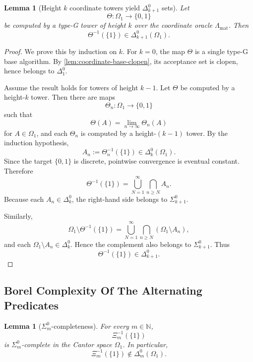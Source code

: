 \documentclass{lmcs} %
\theoremstyle{plain}
\theoremstyle{plain}
\newtheorem{lemma}[theorem]{Lemma}
\theoremstyle{definition}
\theoremstyle{remark}
\theoremstyle{definition}
\theoremstyle{remark}
\numberwithin{equation}{section}
\begin{document}
\begin{lemma}[Height \(k\) coordinate towers yield \(\Delta^0_{k+1}\) sets]\label{lem:height-k-delta}
Let
\[
\Theta:\Omega_1\to\{0,1\}
\]
be computed by a type-G tower of height \(k\) over the coordinate oracle \(\Lambda_{\mathrm{mat}}\). Then
\[
\Theta^{-1}(\{1\})\in\Delta^0_{k+1}(\Omega_1).
\]
\end{lemma}

\begin{proof}
We prove this by induction on \(k\). For \(k=0\), the map \(\Theta\) is a single type-G base algorithm. By \cref{lem:coordinate-base-clopen}, its acceptance set is clopen, hence belongs to \(\Delta^0_1\).

Assume the result holds for towers of height \(k-1\). Let \(\Theta\) be computed by a height-\(k\) tower. Then there are maps
\[
\Theta_n:\Omega_1\to\{0,1\}
\]
such that
\[
\Theta(A)=\lim_{n\to\infty}\Theta_n(A)
\]
for $A\in\Omega_1$, and each \(\Theta_n\) is computed by a height-\((k-1)\) tower. By the induction hypothesis,
\[
A_n:=\Theta_n^{-1}(\{1\})\in\Delta^0_k(\Omega_1).
\]
Since the target \(\{0,1\}\) is discrete, pointwise convergence is eventual constant. Therefore
\[
\Theta^{-1}(\{1\}) = \bigcup_{N=1}^\infty \bigcap_{n\ge N} A_n.
\]
Because each \(A_n\in\Delta^0_k\), the right-hand side belongs to \(\Sigma^0_{k+1}\).

Similarly,
\[
\Omega_1\setminus\Theta^{-1}(\{1\}) = \bigcup_{N=1}^\infty \bigcap_{n\ge N}(\Omega_1\setminus A_n),
\]
and each \(\Omega_1\setminus A_n\in\Delta^0_k\). Hence the complement also belongs to \(\Sigma^0_{k+1}\). Thus
\[
\Theta^{-1}(\{1\})\in\Delta^0_{k+1}.
\]
\end{proof}

\subsection{Borel Complexity Of The Alternating Predicates}

\begin{lemma}[\(\Sigma^0_m\)-completeness]\label{lem:Xi-m-complete}
For every \(m\in \mathbb{N}\),
\[
\Xi_m^{-1}(\{1\})
\]
is \(\Sigma^0_m\)-complete in the Cantor space \(\Omega_1\). In particular,
\[
\Xi_m^{-1}(\{1\})\notin\Delta^0_m(\Omega_1).
\]
\end{lemma}
\end{document}
